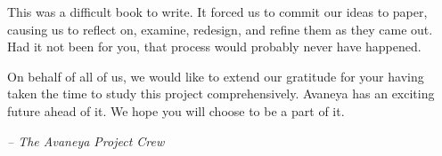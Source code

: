 

This was a difficult book to write. It forced us to commit our ideas to paper, causing us to reflect on, examine, redesign, and refine them as they came out. Had it not been for you, that process would probably never have happened. 

On behalf of all of us, we would like to extend our gratitude for your having taken the time to study this project comprehensively. Avaneya has an exciting future ahead of it. We hope you will choose to be a part of it. 

\hskip 1.5cm {\it -- The Avaneya Project Crew}

\StopChapter


